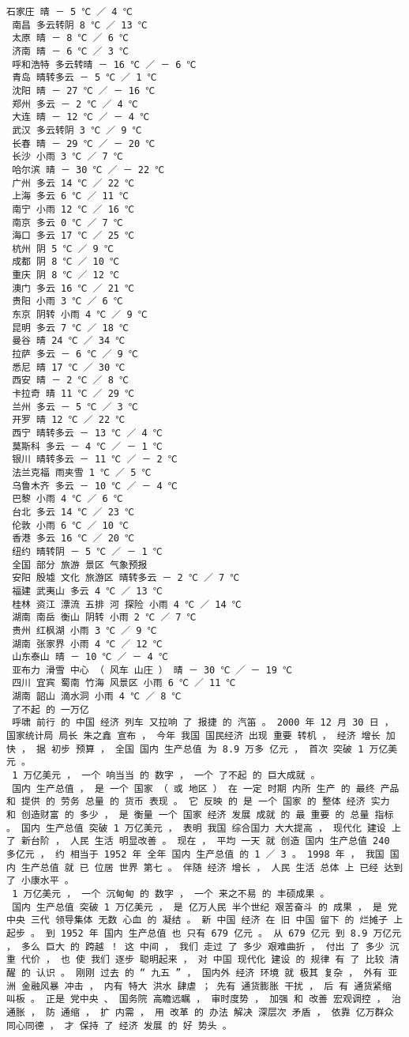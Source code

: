 \documentclass{article}
\begin{document}
\begin{Verbatim}[commandchars=\\\{\}]
 石家庄 晴 － 5 ℃ ／ 4 ℃ 
 南昌 多云转阴 8 ℃ ／ 13 ℃ 
 太原 晴 － 8 ℃ ／ 6 ℃ 
 济南 晴 － 6 ℃ ／ 3 ℃ 
 呼和浩特 多云转晴 － 16 ℃ ／ － 6 ℃ 
 青岛 晴转多云 － 5 ℃ ／ 1 ℃ 
 沈阳 晴 － 27 ℃ ／ － 16 ℃ 
 郑州 多云 － 2 ℃ ／ 4 ℃ 
 大连 晴 － 12 ℃ ／ － 4 ℃ 
 武汉 多云转阴 3 ℃ ／ 9 ℃ 
 长春 晴 － 29 ℃ ／ － 20 ℃ 
 长沙 小雨 3 ℃ ／ 7 ℃ 
 哈尔滨 晴 － 30 ℃ ／ － 22 ℃ 
 广州 多云 14 ℃ ／ 22 ℃ 
 上海 多云 6 ℃ ／ 11 ℃ 
 南宁 小雨 12 ℃ ／ 16 ℃ 
 南京 多云 0 ℃ ／ 7 ℃ 
 海口 多云 17 ℃ ／ 25 ℃ 
 杭州 阴 5 ℃ ／ 9 ℃ 
 成都 阴 8 ℃ ／ 10 ℃ 
 重庆 阴 8 ℃ ／ 12 ℃ 
 澳门 多云 16 ℃ ／ 21 ℃ 
 贵阳 小雨 3 ℃ ／ 6 ℃ 
 东京 阴转 小雨 4 ℃ ／ 9 ℃ 
 昆明 多云 7 ℃ ／ 18 ℃ 
 曼谷 晴 24 ℃ ／ 34 ℃ 
 拉萨 多云 － 6 ℃ ／ 9 ℃ 
 悉尼 晴 17 ℃ ／ 30 ℃ 
 西安 晴 － 2 ℃ ／ 8 ℃ 
 卡拉奇 晴 11 ℃ ／ 29 ℃ 
 兰州 多云 － 5 ℃ ／ 3 ℃ 
 开罗 晴 12 ℃ ／ 22 ℃ 
 西宁 晴转多云 － 13 ℃ ／ 4 ℃ 
 莫斯科 多云 － 4 ℃ ／ － 1 ℃ 
 银川 晴转多云 － 11 ℃ ／ － 2 ℃ 
 法兰克福 雨夹雪 1 ℃ ／ 5 ℃ 
 乌鲁木齐 多云 － 10 ℃ ／ － 4 ℃ 
 巴黎 小雨 4 ℃ ／ 6 ℃ 
 台北 多云 14 ℃ ／ 23 ℃ 
 伦敦 小雨 6 ℃ ／ 10 ℃ 
 香港 多云 16 ℃ ／ 20 ℃ 
 纽约 晴转阴 － 5 ℃ ／ － 1 ℃ 
 全国 部分 旅游 景区 气象预报 
 安阳 殷墟 文化 旅游区 晴转多云 － 2 ℃ ／ 7 ℃ 
 福建 武夷山 多云 4 ℃ ／ 13 ℃ 
 桂林 资江 漂流 五排 河 探险 小雨 4 ℃ ／ 14 ℃ 
 湖南 南岳 衡山 阴转 小雨 2 ℃ ／ 7 ℃ 
 贵州 红枫湖 小雨 3 ℃ ／ 9 ℃ 
 湖南 张家界 小雨 4 ℃ ／ 12 ℃ 
 山东泰山 晴 － 10 ℃ ／ － 4 ℃ 
 亚布力 滑雪 中心 （ 风车 山庄 ） 晴 － 30 ℃ ／ － 19 ℃ 
 四川 宜宾 蜀南 竹海 风景区 小雨 6 ℃ ／ 11 ℃ 
 湖南 韶山 滴水洞 小雨 4 ℃ ／ 8 ℃ 
 了不起 的 一万亿 
 呼啸 前行 的 中国 经济 列车 又拉响 了 报捷 的 汽笛 。 2000 年 12 月 30 日 ， 国家统计局 局长 朱之鑫 宣布 ， 今年 我国 国民经济 出现 重要 转机 ， 经济 增长 加快 ， 据 初步 预算 ， 全国 国内 生产总值 为 8.9 万多 亿元 ， 首次 突破 1 万亿美元 。 
 1 万亿美元 ， 一个 响当当 的 数字 ， 一个 了不起 的 巨大成就 。 
 国内 生产总值 ， 是 一个 国家 （ 或 地区 ） 在 一定 时期 内所 生产 的 最终 产品 和 提供 的 劳务 总量 的 货币 表现 。 它 反映 的 是 一个 国家 的 整体 经济 实力 和 创造财富 的 多少 ， 是 衡量 一个 国家 经济 发展 成就 的 最 重要 的 总量 指标 。 国内 生产总值 突破 1 万亿美元 ， 表明 我国 综合国力 大大提高 ， 现代化 建设 上 了 新台阶 ， 人民 生活 明显改善 。 现在 ， 平均 一天 就 创造 国内 生产总值 240 多亿元 ， 约 相当于 1952 年 全年 国内 生产总值 的 1 ／ 3 。 1998 年 ， 我国 国内 生产总值 就 已 位居 世界 第七 。 伴随 经济 增长 ， 人民 生活 总体 上 已经 达到 了 小康水平 。 
 1 万亿美元 ， 一个 沉甸甸 的 数字 ， 一个 来之不易 的 丰硕成果 。 
 国内 生产总值 突破 1 万亿美元 ， 是 亿万人民 半个世纪 艰苦奋斗 的 成果 ， 是 党中央 三代 领导集体 无数 心血 的 凝结 。 新 中国 经济 在 旧 中国 留下 的 烂摊子 上 起步 。 到 1952 年 国内 生产总值 也 只有 679 亿元 。 从 679 亿元 到 8.9 万亿元 ， 多么 巨大 的 跨越 ！ 这 中间 ， 我们 走过 了 多少 艰难曲折 ， 付出 了 多少 沉重 代价 ， 也 使 我们 逐步 聪明起来 ， 对 中国 现代化 建设 的 规律 有 了 比较 清醒 的 认识 。 刚刚 过去 的 “ 九五 ” ， 国内外 经济 环境 就 极其 复杂 ， 外有 亚洲 金融风暴 冲击 ， 内有 特大 洪水 肆虐 ； 先有 通货膨胀 干扰 ， 后 有 通货紧缩 叫板 。 正是 党中央 、 国务院 高瞻远瞩 ， 审时度势 ， 加强 和 改善 宏观调控 ， 治 通胀 ， 防 通缩 ， 扩 内需 ， 用 改革 的 办法 解决 深层次 矛盾 ， 依靠 亿万群众 同心同德 ， 才 保持 了 经济 发展 的 好 势头 。 

\end{Verbatim}
\end{document}
